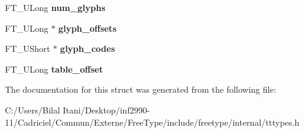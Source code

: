 \begin{DoxyCompactItemize}
\item 
F\+T\+\_\+\+U\+Long {\bfseries num\+\_\+glyphs}\hypertarget{struct_t_t___s_bit___range_rec___afd9437150f8d9f784f98da6d61223464}{}\label{struct_t_t___s_bit___range_rec___afd9437150f8d9f784f98da6d61223464}

\item 
F\+T\+\_\+\+U\+Long $\ast$ {\bfseries glyph\+\_\+offsets}\hypertarget{struct_t_t___s_bit___range_rec___a475f649f101b5886cc2443934e6aa9ca}{}\label{struct_t_t___s_bit___range_rec___a475f649f101b5886cc2443934e6aa9ca}

\item 
F\+T\+\_\+\+U\+Short $\ast$ {\bfseries glyph\+\_\+codes}\hypertarget{struct_t_t___s_bit___range_rec___ad40d4aa7e48bdb4ab8c98850f1bba178}{}\label{struct_t_t___s_bit___range_rec___ad40d4aa7e48bdb4ab8c98850f1bba178}

\item 
F\+T\+\_\+\+U\+Long {\bfseries table\+\_\+offset}\hypertarget{struct_t_t___s_bit___range_rec___a54457937305b5ccf895f5b23c0cc6006}{}\label{struct_t_t___s_bit___range_rec___a54457937305b5ccf895f5b23c0cc6006}

\end{DoxyCompactItemize}


The documentation for this struct was generated from the following file\+:\begin{DoxyCompactItemize}
\item 
C\+:/\+Users/\+Bilal Itani/\+Desktop/inf2990-\/11/\+Cadriciel/\+Commun/\+Externe/\+Free\+Type/include/freetype/internal/tttypes.\+h\end{DoxyCompactItemize}

